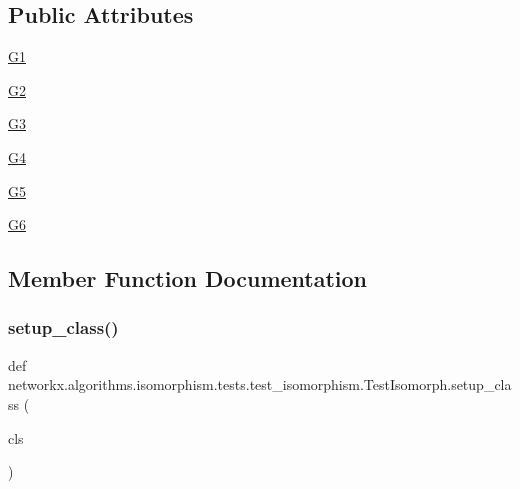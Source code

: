 \subsection*{Public Attributes}
\begin{DoxyCompactItemize}
\item 
\hyperlink{classnetworkx_1_1algorithms_1_1isomorphism_1_1tests_1_1test__isomorphism_1_1TestIsomorph_ac14de2514c4c3e5af06502166955a5d9}{G1}
\item 
\hyperlink{classnetworkx_1_1algorithms_1_1isomorphism_1_1tests_1_1test__isomorphism_1_1TestIsomorph_abb0056e4ccbbe75bcf5e74c493178195}{G2}
\item 
\hyperlink{classnetworkx_1_1algorithms_1_1isomorphism_1_1tests_1_1test__isomorphism_1_1TestIsomorph_a2d0d453288ae14855e75e77920065213}{G3}
\item 
\hyperlink{classnetworkx_1_1algorithms_1_1isomorphism_1_1tests_1_1test__isomorphism_1_1TestIsomorph_af94e7eceaefbe8e0723b32e616363243}{G4}
\item 
\hyperlink{classnetworkx_1_1algorithms_1_1isomorphism_1_1tests_1_1test__isomorphism_1_1TestIsomorph_aa4461962994ef41007683348c908b34e}{G5}
\item 
\hyperlink{classnetworkx_1_1algorithms_1_1isomorphism_1_1tests_1_1test__isomorphism_1_1TestIsomorph_adcdd54e5c6b9f51c107df79a012508d8}{G6}
\end{DoxyCompactItemize}


\subsection{Member Function Documentation}
\mbox{\label{classnetworkx_1_1algorithms_1_1isomorphism_1_1tests_1_1test__isomorphism_1_1TestIsomorph_a417a35964fbb51329a295165396b9ab2}} 
\subsubsection{\texorpdfstring{setup\+\_\+class()}{setup\_class()}}
{\footnotesize\ttfamily def networkx.\+algorithms.\+isomorphism.\+tests.\+test\+\_\+isomorphism.\+Test\+Isomorph.\+setup\+\_\+class (\begin{DoxyParamCaption}\item[{}]{cls }\end{DoxyParamCaption})}

